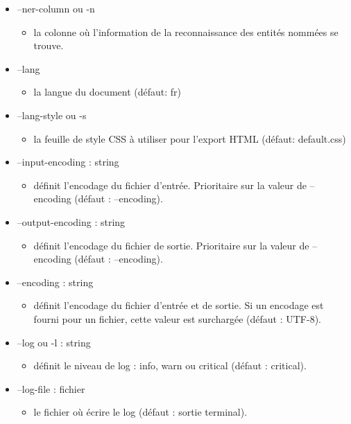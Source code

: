 \documentclass[manual-fr.tex]{subfiles}
\begin{document}
\begin{itemize}
\begin{itemize}
            \item[] --ner-column ou -n
                \begin{itemize}
                    \item[] la colonne où l'information de la reconnaissance des entités nommées se trouve.
                \end{itemize}
            \item[] --lang
                \begin{itemize}
                    \item[] la langue du document (défaut: fr)
                \end{itemize}
            \item[] --lang-style ou -s
                \begin{itemize}
                    \item[] la feuille de style CSS à utiliser pour l'export HTML (défaut: default.css)
                \end{itemize}
            \item[] --input-encoding : string
                \begin{itemize}
                    \item[] définit l'encodage du fichier d'entrée. Prioritaire sur la valeur de --encoding (défaut : --encoding).
                \end{itemize}
            \item[] --output-encoding : string
                \begin{itemize}
                    \item[] définit l'encodage du fichier de sortie. Prioritaire sur la valeur de --encoding (défaut : --encoding).
                \end{itemize}
            \item[] --encoding : string
                \begin{itemize}
                    \item[] définit l'encodage du fichier d'entrée et de sortie. Si un encodage est fourni pour un fichier,
                        cette valeur est surchargée (défaut : UTF-8).
                \end{itemize}
            \item[] --log ou -l : string
                \begin{itemize}
                    \item[] définit le niveau de log : info, warn ou critical (défaut : critical).
                \end{itemize}
            \item[] --log-file : fichier
                \begin{itemize}
                    \item[] le fichier où écrire le log (défaut : sortie terminal).
                \end{itemize}
        \end{itemize}
\end{itemize}
\end{document}
